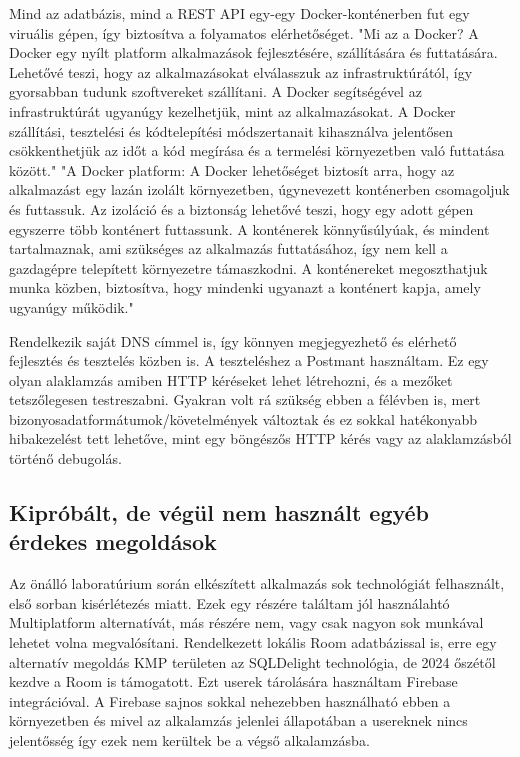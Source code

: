 Mind az adatbázis, mind a REST API egy-egy Docker-konténerben fut egy viruális gépen, így biztosítva a folyamatos elérhetőséget.
"Mi az a Docker? A Docker egy nyílt platform alkalmazások fejlesztésére, szállítására és futtatására. Lehetővé teszi, hogy az alkalmazásokat elválasszuk az infrastruktúrától, így gyorsabban tudunk szoftvereket szállítani. A Docker segítségével az infrastruktúrát ugyanúgy kezelhetjük, mint az alkalmazásokat. A Docker szállítási, tesztelési és kódtelepítési módszertanait kihasználva jelentősen csökkenthetjük az időt a kód megírása és a termelési környezetben való futtatása között." \cite{Docker}
"A Docker platform: A Docker lehetőséget biztosít arra, hogy az alkalmazást egy lazán izolált környezetben, úgynevezett konténerben csomagoljuk és futtassuk. Az izoláció és a biztonság lehetővé teszi, hogy egy adott gépen egyszerre több konténert futtassunk. A konténerek könnyűsúlyúak, és mindent tartalmaznak, ami szükséges az alkalmazás futtatásához, így nem kell a gazdagépre telepített környezetre támaszkodni. A konténereket megoszthatjuk munka közben, biztosítva, hogy mindenki ugyanazt a konténert kapja, amely ugyanúgy működik." \cite{Docker}


Rendelkezik saját DNS címmel is, így könnyen megjegyezhető és elérhető fejlesztés és tesztelés közben is.
A teszteléshez a Postmant használtam. Ez egy olyan alaklamzás amiben HTTP kéréseket lehet létrehozni, és a mezőket tetszőlegesen testreszabni.
Gyakran volt rá szükség ebben a félévben is, mert bizonyosadatformátumok/követelmények változtak és ez sokkal hatékonyabb hibakezelést tett lehetőve, mint egy böngészős HTTP kérés vagy az alaklamzásból történő debugolás.


\subsection{Kipróbált, de végül nem használt egyéb érdekes megoldások}

Az önálló laboratúrium során elkészített alkalmazás sok technológiát felhasznált, első sorban kisérlétezés miatt.
Ezek egy részére találtam jól használahtó Multiplatform alternatívát, más részére nem, vagy csak nagyon sok munkával lehetet volna megvalósítani.
Rendelkezett lokális Room adatbázissal is, erre egy alternatív megoldás KMP területen az SQLDelight technológia, de 2024 őszétől kezdve a Room is támogatott. 
Ezt userek tárolására használtam Firebase integrációval. A Firebase sajnos sokkal nehezebben használható ebben a környezetben és mivel az alkalamzás jelenlei állapotában a usereknek nincs jelentősség így ezek nem kerültek be a végső alkalamzásba.

